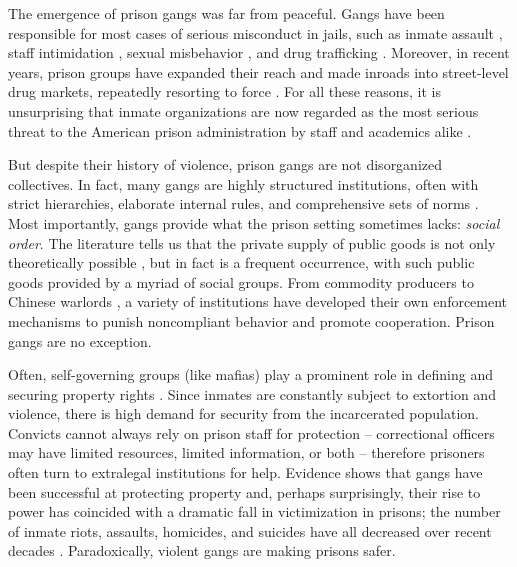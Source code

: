 \documentclass[a4paper, 12pt]{article}
\begin{document}
The emergence of prison gangs was far from peaceful. Gangs have been responsible for most cases of serious misconduct in jails, such as inmate assault \citep{cunningham2007predictive, ralph1991gang,reisig2002administrative}, staff intimidation \citep{gaes2002influence}, sexual misbehavior \citep{ralph1991gang,wyatt2005male}, and drug trafficking \citep{shelden1991comparison}. Moreover, in recent years, prison groups have expanded their reach and made inroads into street-level drug markets,  repeatedly resorting to force \citep[e.g.][]{skarbek2011governance,valdez2005mexican}. For all these reasons, it is unsurprising that inmate organizations are now regarded as the most serious threat to the American prison administration by staff and academics alike \citep{carlson2001prison,delisi2004gang,fleisher2001overview}.

But despite their history of violence, prison gangs are not disorganized collectives. In fact, many gangs are highly structured institutions, often with strict hierarchies, elaborate internal rules, and comprehensive sets of norms \citep{leeson2010criminal,skarbek2012prison}. Most importantly, gangs provide what the prison setting sometimes lacks: \textit{social order}. The literature tells us that the private supply of public goods is not only theoretically possible \citep{bergstrom1986private,olson1965logic,ostrom1992covenants}, but in fact is a frequent occurrence, with such public goods provided by a myriad of social groups. From commodity producers \citep{schepel2005constitution} to Chinese warlords \citep{jackson2003warlords}, a variety of institutions have developed their own enforcement mechanisms to punish noncompliant behavior and promote cooperation. Prison gangs are no exception. 

Often, self-governing groups (like mafias)  play a prominent role in defining and securing property rights \citep{gambetta1996sicilian,skaperdas2001political,varese2011mafias}. Since inmates are constantly subject to extortion and violence, there is high demand for security from the incarcerated population. Convicts cannot always rely on prison staff for protection -- correctional officers may have limited resources, limited information, or both -- therefore prisoners often turn to extralegal institutions for help. Evidence shows that gangs have been successful at protecting property and, perhaps surprisingly, their rise to power has coincided with a dramatic fall in victimization in prisons; the number of inmate riots, assaults, homicides, and suicides have all decreased over recent decades \citep{useem2006prison}. Paradoxically, violent gangs are making prisons safer.
\end{document}
